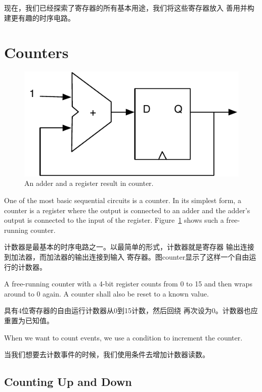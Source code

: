 \documentclass[%
    10pt,
    headinclude, footexclude,
    openright, %
    notitlepage,
    cleardoubleempty,
    headsepline,
    pointlessnumbers,
    bibtotoc, idxtotoc,
    ]{scrbook}
\newcommand{\scale}{0.7}
\begin{document}
现在，我们已经探索了寄存器的所有基本用途，我们将这些寄存器放入
善用并构建更有趣的时序电路。

\section{Counters}
\label{sec:counter}

\begin{figure}
  \centering
  \includegraphics[scale=\scale]{figures/counter}
  \caption{An adder and a register result in counter.}
  \label{fig:counter}
\end{figure}

One of the most basic sequential circuits is a counter. In its simplest form, a counter is a register
where the output is connected to an adder and the adder's output is connected to the input
of the register. Figure~\ref{fig:counter} shows such a free-running counter.

计数器是最基本的时序电路之一。以最简单的形式，计数器就是寄存器
输出连接到加法器，而加法器的输出连接到输入
寄存器。图counter显示了这样一个自由运行的计数器。

A free-running counter with a 4-bit register counts from 0 to 15 and then wraps around
to 0 again. A counter shall also be reset to a known value.

具有4位寄存器的自由运行计数器从0到15计数，然后回绕
再次设为0。计数器也应重置为已知值。


\noindent When we want to count events, we use a condition to  increment the counter.

\noindent 当我们想要去计数事件的时候，我们使用条件去增加计数器读数。


\subsection{Counting Up and Down}
\end{document}
